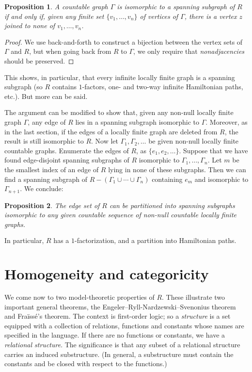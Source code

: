 \documentclass[12pt]{article}
\newtheorem{proposition}{Proposition}
\begin{document}
\begin{proposition}\label{ch32:prop4.2} 
A countable graph $\Gamma$ is isomorphic to a
spanning subgraph of $R$ if and only if, given any finite set
$\{v_1, \ldots, v_n\}$ of vertices of $\Gamma$, there is a vertex
$z$ joined to none of $v_1, \ldots, v_n$.
\end{proposition}
\begin{proof}
We use back-and-forth to construct a bijection
between the vertex sets of $\Gamma$ and $R$, but when going back
from $R$ to $\Gamma$, we only require that \emph{nonadjacencies}
should be preserved.
\end{proof}

This shows, in particular, that every infinite locally finite graph
is a spanning subgraph (so $R$ contains $1$-factors, one- and two-way
infinite Hamiltonian paths, etc.). But more can be said.

The argument can be modified to show that, given any non-null
locally finite graph $\Gamma$, any edge of $R$ lies in a spanning
subgraph isomorphic to $\Gamma$. Moreover, as in the last section,
if the edges of a locally finite graph are deleted from $R$, the
result is still isomorphic to $R$. Now let $\Gamma_1,
\Gamma_2,\ldots$ be given non-null locally finite countable graphs.
Enumerate the edges of $R$, as $\{e_1,e_2,\ldots\}$. Suppose that
we have found edge-disjoint spanning subgraphs of $R$ isomorphic to
$\Gamma_1,\ldots,\Gamma_n$. Let $m$ be the smallest index of an edge
of $R$ lying in none of these subgraphs. Then we can find a spanning
subgraph of $R - (\Gamma_1 \cup\cdots\cup\Gamma_n)$ containing $e_m$
and isomorphic to $\Gamma_{n +1}$. We conclude:

\begin{proposition}\label{ch32:prop4.3} 
The edge set of $R$ can be partitioned into
spanning subgraphs isomorphic to any given countable sequence of
non-null countable locally finite graphs.
\end{proposition}

In particular, $R$ has a $1$-factorization, and a partition into
Hamiltonian paths.

\section{Homogeneity and categoricity}%
\label{ch32:sec2.5}

We come now to two model-theoretic properties of $R$. These
illustrate two important general theorems, the
Engeler--Ryll-Nardzewski--Svenonius theorem and Fra\"{i}ss\'{e}'s
theorem. The context is first-order logic; so a \emph{structure}
is a set equipped with a collection of relations, functions and
constants whose names are specified in the language. If there are no
functions or constants, we have a \emph{relational structure}. The
significance is that any subset of a relational structure carries an
induced substructure. (In general, a substructure must contain the
constants and be closed with respect to the functions.)
\end{document}
